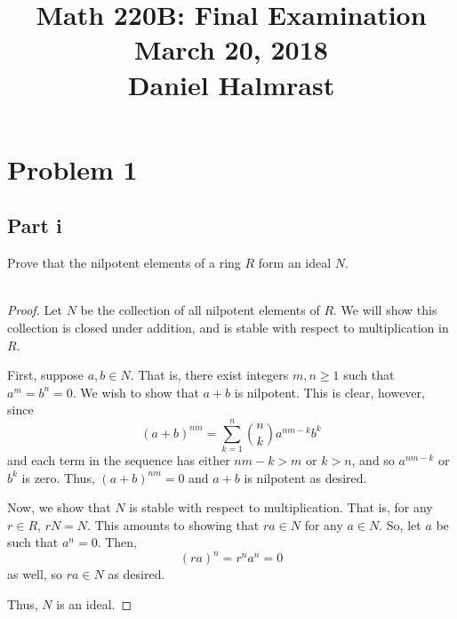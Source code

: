 \documentclass[12pt,reqno]{amsart}
\begin{document}
\title[]{Math 220B: Final Examination\\March 20, 2018\\Daniel Halmrast}
\maketitle
\large

\section*{Problem 1}
\subsection*{Part i}
Prove that the nilpotent elements of a ring $R$ form an ideal $N$.
\\
\\
\begin{proof}
    Let $N$ be the collection of all nilpotent elements of $R$. We will show
    this collection is closed under addition, and is stable with respect to
    multiplication in $R$.

    First, suppose $a,b\in N$. That is, there exist integers $m,n\geq 1$ such
    that $a^m = b^n=0$. We wish to show that $a+b$ is nilpotent. This is clear,
    however, since
    \[
        (a+b)^{nm} = \sum_{k=1}^n\binom{n}{k}a^{nm-k}b^k
    \]
    and each term in the sequence has either $nm-k > m$ or $k>n$, and so
    $a^{nm-k}$ or $b^k$ is zero. Thus, $(a+b)^{nm}=0$ and $a+b$ is nilpotent as
    desired.

    Now, we show that $N$ is stable with respect to multiplication. That is, for
    any $r\in R$, $rN= N$. This amounts to showing that $ra\in N$ for any $a\in
    N$. So, let $a$ be such that $a^n=0$. Then,
    \[
        (ra)^n = r^na^n = 0
    \]
    as well, so $ra\in N$ as desired.

    Thus, $N$ is an ideal.
\end{proof}
\end{document}
